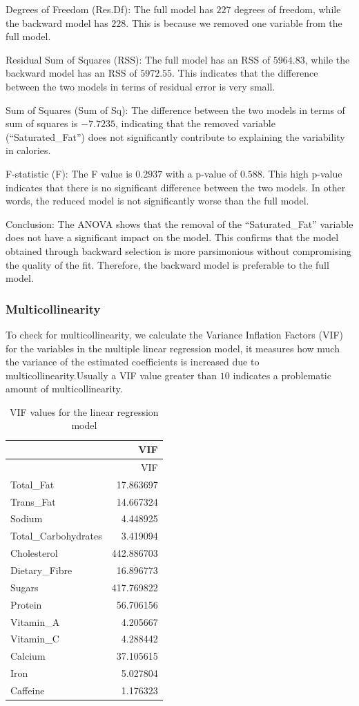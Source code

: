 \documentclass[
]{article}
\begin{document}
Degrees of Freedom (Res.Df): The full model has \(227\) degrees of
freedom, while the backward model has \(228\). This is because we
removed one variable from the full model.

Residual Sum of Squares (RSS): The full model has an RSS of \(5964.83\),
while the backward model has an RSS of \(5972.55\). This indicates that
the difference between the two models in terms of residual error is very
small.

Sum of Squares (Sum of Sq): The difference between the two models in
terms of sum of squares is \(-7.7235\), indicating that the removed
variable (``Saturated\_Fat'') does not significantly contribute to
explaining the variability in calories.

F-statistic (F): The F value is \(0.2937\) with a p-value of \(0.588\).
This high p-value indicates that there is no significant difference
between the two models. In other words, the reduced model is not
significantly worse than the full model.

Conclusion: The ANOVA shows that the removal of the ``Saturated\_Fat''
variable does not have a significant impact on the model. This confirms
that the model obtained through backward selection is more parsimonious
without compromising the quality of the fit. Therefore, the backward
model is preferable to the full model.

\subsubsection{Multicollinearity}\label{multicollinearity}

To check for multicollinearity, we calculate the Variance Inflation
Factors (VIF) for the variables in the multiple linear regression model,
it measures how much the variance of the estimated coefficients is
increased due to multicollinearity.Usually a VIF value greater than
\(10\) indicates a problematic amount of multicollinearity.

\begin{longtable}[]{@{}lr@{}}
\caption{VIF values for the linear regression model}\tabularnewline
\toprule\noalign{}
& VIF \\
\midrule\noalign{}
\endfirsthead
\toprule\noalign{}
& VIF \\
\midrule\noalign{}
\endhead
\bottomrule\noalign{}
\endlastfoot
Total\_Fat & 17.863697 \\
Trans\_Fat & 14.667324 \\
Sodium & 4.448925 \\
Total\_Carbohydrates & 3.419094 \\
Cholesterol & 442.886703 \\
Dietary\_Fibre & 16.896773 \\
Sugars & 417.769822 \\
Protein & 56.706156 \\
Vitamin\_A & 4.205667 \\
Vitamin\_C & 4.288442 \\
Calcium & 37.105615 \\
Iron & 5.027804 \\
Caffeine & 1.176323 \\
\end{longtable}
\end{document}
